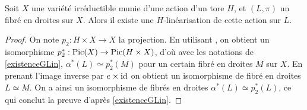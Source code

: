 \begin{lem}\label{existenceGLinTore}
Soit $X$ une variété irréductible munie d'une action d'un tore $H$, et $(L,\pi)$ un fibré en droites sur $X$. Alors il existe une $H$-linéarisation de cette action sur $L$.
\end{lem}
\begin{proof}
On note $p_2:H\times X\rightarrow X$ la projection. En utilisant \cite[II.6.6]{Hartshorne}, on obtient un isomorphisme $p_2^*:\operatorname{Pic}(X)\rightarrow \operatorname{Pic}(H\times X)$, d'où avec les notations de \ref{existenceGLin}, $\alpha^*(L)\simeq p_2^*(M)$ pour un certain fibré en droites $M$ sur $X$. En prenant l'image inverse par $e\times \operatorname{id}$ on obtient un isomorphisme de fibré en droites $L\simeq M$. On a ainsi un isomorphisme de fibrés en droites $\alpha^*(L)\simeq p_2^*(L)$, ce qui conclut la preuve d'après \ref{existenceGLin}.
\end{proof}

